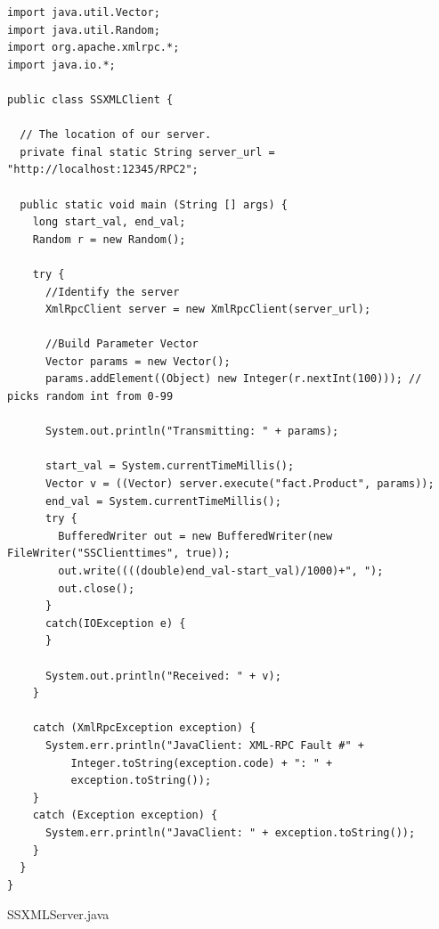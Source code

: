 \documentclass{article}
\begin{document}
\begin{lstlisting}
import java.util.Vector;
import java.util.Random;
import org.apache.xmlrpc.*;
import java.io.*;

public class SSXMLClient {

  // The location of our server.
  private final static String server_url = "http://localhost:12345/RPC2";

  public static void main (String [] args) {
    long start_val, end_val;
    Random r = new Random();

    try {
      //Identify the server
      XmlRpcClient server = new XmlRpcClient(server_url);

      //Build Parameter Vector
      Vector params = new Vector();
      params.addElement((Object) new Integer(r.nextInt(100))); // picks random int from 0-99

      System.out.println("Transmitting: " + params);

      start_val = System.currentTimeMillis();
      Vector v = ((Vector) server.execute("fact.Product", params));
      end_val = System.currentTimeMillis();
      try {
        BufferedWriter out = new BufferedWriter(new FileWriter("SSClienttimes", true));
        out.write((((double)end_val-start_val)/1000)+", ");
        out.close();
      }
      catch(IOException e) {
      }

      System.out.println("Received: " + v);
    }

    catch (XmlRpcException exception) {
      System.err.println("JavaClient: XML-RPC Fault #" +
          Integer.toString(exception.code) + ": " +
          exception.toString());
    }
    catch (Exception exception) {
      System.err.println("JavaClient: " + exception.toString());
    }
  }
}
\end{lstlisting}

SSXMLServer.java
\end{document}

